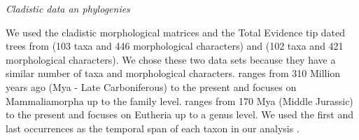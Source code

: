 \documentclass[12pt,letterpaper]{article}
\renewcommand{\subsection}[1]{%
\bigskip
\begin{center}
\begin{large}
\normalfont\itshape #1
\end{large}
\end{center}}
\begin{document}

\subsection{Cladistic data an phylogenies}
We used the cladistic morphological matrices and the Total Evidence tip dated trees \citep{ronquista2012} from \cite{Slater2012MEE} (103 taxa and 446 morphological characters) and \cite{beckancient2014} (102 taxa and 421 morphological characters).
We chose these two data sets because they have a similar number of taxa and morphological characters.
\cite{Slater2012MEE} ranges from 310 Million years ago (Mya - Late Carboniferous) to the present and focuses on Mammaliamorpha up to the family level.
\cite{beckancient2014} ranges from 170 Mya (Middle Jurassic) to the present and focuses on Eutheria up to a genus level.
We used the first and last occurrences as the temporal span of each taxon in our analysis \citep{Slater2012MEE,beckancient2014}.
\end{document}
